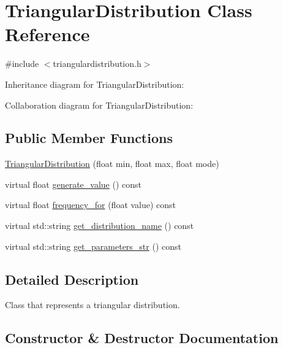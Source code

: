 \hypertarget{classTriangularDistribution}{}\section{Triangular\+Distribution Class Reference}
\label{classTriangularDistribution}


{\ttfamily \#include $<$triangulardistribution.\+h$>$}



Inheritance diagram for Triangular\+Distribution\+:


Collaboration diagram for Triangular\+Distribution\+:
\subsection*{Public Member Functions}
\begin{DoxyCompactItemize}
\item 
\hyperlink{classTriangularDistribution_a40478f0856ecf66c9b42addf3372394a}{Triangular\+Distribution} (float min, float max, float mode)
\item 
virtual float \hyperlink{classTriangularDistribution_a76d6a4477676d8f4d85513b887b4f2b3}{generate\+\_\+value} () const
\item 
virtual float \hyperlink{classTriangularDistribution_a9a87e1d66d544ce0460dd457a6740dce}{frequency\+\_\+for} (float value) const
\item 
virtual std\+::string \hyperlink{classTriangularDistribution_ae9ceb04d07ea5f9dd9390ec62a7d0849}{get\+\_\+distribution\+\_\+name} () const
\item 
virtual std\+::string \hyperlink{classTriangularDistribution_af54199e88d5c537fe621ae177b86a9d6}{get\+\_\+parameters\+\_\+str} () const
\end{DoxyCompactItemize}


\subsection{Detailed Description}
Class that represents a triangular distribution. 

\subsection{Constructor \& Destructor Documentation}
\mbox{\label{classTriangularDistribution_a40478f0856ecf66c9b42addf3372394a}} 
